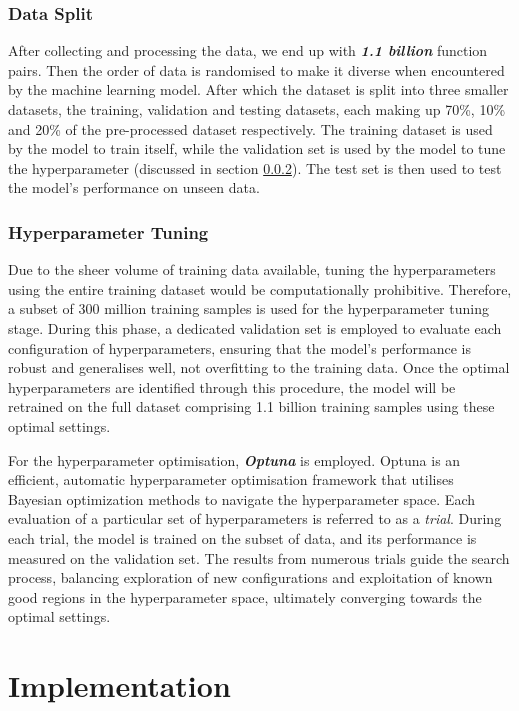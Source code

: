 \subsubsection{Data Split}
After collecting and processing the data, we end up with \textbf{\textit{1.1 billion}} function pairs. Then the order of data is randomised to make it diverse when encountered by the machine learning model. After which the dataset is split into three smaller datasets, the training, validation and testing datasets, each making up 70\%, 10\% and 20\% of the pre-processed dataset respectively. The training dataset is used by the model to train itself, while the validation set is used by the model to tune the hyperparameter (discussed in section \ref{subsubsection:HyperparameterTuning}). The test set is then used to test the model's performance on unseen data.

\subsubsection{Hyperparameter Tuning} \label{subsubsection:HyperparameterTuning}
Due to the sheer volume of training data available, tuning the hyperparameters using the entire training dataset would be computationally prohibitive. Therefore, a subset of 300 million training samples is used for the hyperparameter tuning stage. During this phase, a dedicated validation set is employed to evaluate each configuration of hyperparameters, ensuring that the model’s performance is robust and generalises well, not overfitting to the training data. Once the optimal hyperparameters are identified through this procedure, the model will be retrained on the full dataset comprising 1.1 billion training samples using these optimal settings.

For the hyperparameter optimisation, \textbf{\textit{Optuna}} is employed. Optuna is an efficient, automatic hyperparameter optimisation framework that utilises Bayesian optimization methods to navigate the hyperparameter space. Each evaluation of a particular set of hyperparameters is referred to as a \emph{trial}. During each trial, the model is trained on the subset of data, and its performance is measured on the validation set. The results from numerous trials guide the search process, balancing exploration of new configurations and exploitation of known good regions in the hyperparameter space, ultimately converging towards the optimal settings.


\section{Implementation}
